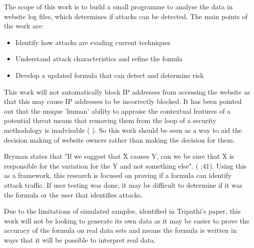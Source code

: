 The scope of this work is to build a small programme to analyse the data in website log files, which determines if attacks can be detected. The main points of the work are:
\begin{itemize}
    \item Identify how attacks are evading current techniques 
    \item Understand attack characteristics and refine the fomula
    \item Develop a updated formula that can detect and determine risk
\end{itemize}

This work will not automatically block IP addresses from accessing the website as that this may cause IP addresses to be incorrectly blocked. It has been pointed out that the unique 'human' ability to appraise the contextual features of a potential threat means that removing them from the loop of a security methodology is inadvisable (\cite{TargetedCyberSecurity} ). So this work should be seen as a way to aid the decision making of website owners rather than making the decision for them. 


Bryman states that  "If we suggest that X causes Y, can we be sure that X is responsible for the variation for the Y and not something else". (\citeauthor{bryman_2016} \citeyear{bryman_2016};41). Using this as a framework, this research is focused on proving if a formula can identify attack traffic. If user testing was done, it may be difficult to determine if it was the formula or the user that identifies attacks.


 Due to the limitations of simulated samples, identified in Tripathi's paper, this work will not be looking to generate its own data as it may be easier to prove the accuracy of the formula on real data sets and  means the formula is written in ways that it will be possible to interpret real data.


